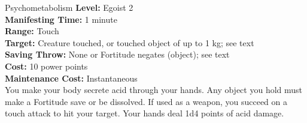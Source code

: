{Psychometabolism}
{
    \textbf{Level:}
    Egoist 2\\
    \textbf{Manifesting Time:}
    1 minute\\
    \textbf{Range:}
    Touch\\
    \textbf{Target:}
    Creature touched, or touched object of up to 1 kg; see text\\
    \textbf{Saving Throw:}
    None or Fortitude negates (object); see text\\
    \textbf{Cost:}
    10 power points\\
    \textbf{Maintenance Cost:}
    Instantaneous\\
}
{
    You make your body secrete acid through your hands. Any object you hold must make a Fortitude save or be dissolved. If used as a weapon, you succeed on a touch attack to hit your target. Your hands deal 1d4 points of acid damage.
}
